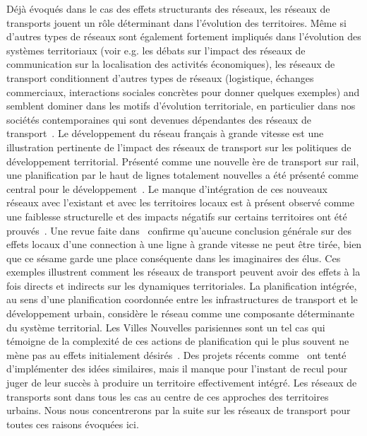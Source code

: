 {}{
Déjà évoqués dans le cas des effets structurants des réseaux, les réseaux de transports jouent un rôle déterminant dans l'évolution des territoires. Même si d'autres types de réseaux sont également fortement impliqués dans l'évolution des systèmes territoriaux (voir e.g. les débats sur l'impact des réseaux de communication sur la localisation des activités économiques), les réseaux de transport conditionnent d'autres types de réseaux (logistique, échanges commerciaux, interactions sociales concrètes pour donner quelques exemples) and semblent dominer dans les motifs d'évolution territoriale, en particulier dans nos sociétés contemporaines qui sont devenues dépendantes des réseaux de transport~\cite{bavoux2005geographie}. Le développement du réseau français à grande vitesse est une illustration pertinente de l'impact des réseaux de transport sur les politiques de développement territorial. Présenté comme une nouvelle ère de transport sur rail, une planification par le haut de lignes totalement nouvelles a été présenté comme central pour le développement~\cite{zembri1997fondements}. Le manque d'intégration de ces nouveaux réseaux avec l'existant et avec les territoires locaux est à présent observé comme une faiblesse structurelle et des impacts négatifs sur certains territoires ont été prouvés~\cite{zembri2008contribution}. Une revue faite dans~\cite{bazin2011grande} confirme qu'aucune conclusion générale sur des effets locaux d'une connection à une ligne à grande vitesse ne peut être tirée, bien que ce sésame garde une place conséquente dans les imaginaires des élus. Ces exemples illustrent comment les réseaux de transport peuvent avoir des effets à la fois directs et indirects sur les dynamiques territoriales. La planification intégrée, au sens d'une planification coordonnée entre les infrastructures de transport et le développement urbain, considère le réseau comme une composante déterminante du système territorial. %
Les Villes Nouvelles parisiennes sont un tel cas qui témoigne de la complexité de ces actions de planification qui le plus souvent ne mène pas au effets initialement désirés~\cite{es119}. Des projets récents comme~\cite{l2012ville} ont tenté d'implémenter des idées similaires, mais il manque pour l'instant de recul pour juger de leur succès à produire un territoire effectivement intégré. Les réseaux de transports sont dans tous les cas au centre de ces approches des territoires urbains. Nous nous concentrerons par la suite sur les réseaux de transport pour toutes ces raisons évoquées ici.
}



